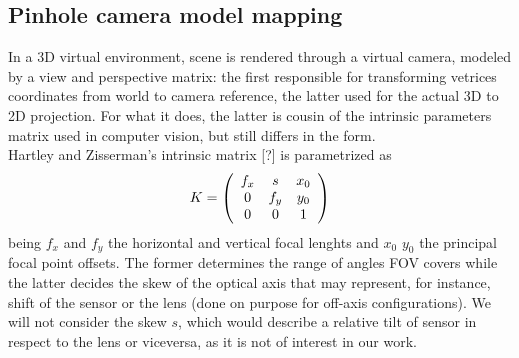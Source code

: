 \subsection{Pinhole camera model mapping}
In a 3D virtual environment, scene is rendered through a virtual camera, modeled by a view and perspective matrix: the first responsible for transforming vetrices coordinates from world to camera reference, the latter used for the actual 3D to 2D projection. For what it does, the latter is cousin of the intrinsic parameters matrix used in computer vision, but still differs in the form.\\
Hartley and Zisserman's intrinsic matrix [?] is parametrized as
\begin{equation}
	K = \left ( 
    		\begin{array}{ c c c}
    		f_x & s   & x_0 \\
    		0  & f_y & y_0 \\
    		0  & 0   & 1 \\
    		\end{array}
    \right )
\label{hz_intrinsic_matrix_original}
\end{equation}
being $f_{x}$ and $f_{y}$ the horizontal and vertical focal lenghts and $x_{0}$ $y_{0}$ the principal focal point offsets. The former determines the range of angles FOV covers while the latter decides the skew of the optical axis that may represent, for instance, shift of the sensor or the lens (done on purpose for off-axis configurations). We will not consider the skew $s$, which would describe a relative tilt of sensor in respect to the lens or viceversa, as it is not of interest in our work.

